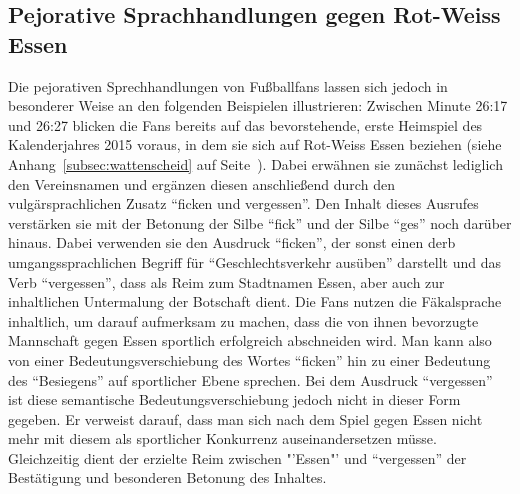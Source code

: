 \subsection{Pejorative Sprachhandlungen gegen Rot-Weiss Essen}
Die pejorativen Sprechhandlungen von Fußballfans lassen sich jedoch in besonderer Weise an den folgenden Beispielen illustrieren:
Zwischen Minute 26:17 und 26:27 blicken die Fans bereits auf das bevorstehende, erste Heimspiel des Kalenderjahres 2015 voraus, in dem sie sich auf Rot-Weiss Essen beziehen (siehe Anhang~\ref{subsec:wattenscheid} auf Seite~\pageref{subsec:wattenscheid}).
Dabei erwähnen sie zunächst lediglich den Vereinsnamen und ergänzen diesen anschließend durch den vulgärsprachlichen Zusatz "`ficken und vergessen"'.
Den Inhalt dieses Ausrufes verstärken sie mit der Betonung der Silbe "`fick"' und der Silbe "`ges"' noch darüber hinaus.
Dabei verwenden sie den Ausdruck "`ficken"', der sonst einen derb umgangssprachlichen Begriff für "`Geschlechtsverkehr ausüben"' darstellt und das Verb "`vergessen"', dass als Reim zum Stadtnamen Essen, aber auch zur inhaltlichen Untermalung der Botschaft dient.
Die Fans nutzen die Fäkalsprache inhaltlich, um darauf aufmerksam zu machen, dass die von ihnen bevorzugte Mannschaft gegen Essen sportlich erfolgreich abschneiden wird.
Man kann also von einer Bedeutungsverschiebung des Wortes "`ficken"' hin zu einer Bedeutung des "`Besiegens"' auf sportlicher Ebene sprechen.
Bei dem Ausdruck "`vergessen"' ist diese semantische Bedeutungsverschiebung jedoch nicht in dieser Form gegeben.
Er verweist darauf, dass man sich nach dem Spiel gegen Essen nicht mehr mit diesem als sportlicher Konkurrenz auseinandersetzen müsse.
Gleichzeitig dient der erzielte Reim zwischen "'Essen"' und "`vergessen"' der Bestätigung und besonderen Betonung des Inhaltes.

